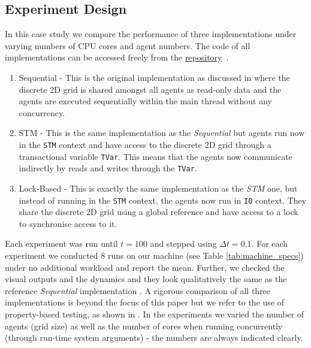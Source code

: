 \subsection{Experiment Design}
In this case study we compare the performance of three implementations under varying numbers of CPU cores and agent numbers. The code of all implementations can be accessed freely from the \href{https://github.com/thalerjonathan/haskell-stm-sir}{repository}~\cite{thaler_stm_sir_repository}.

\begin{enumerate}
	\item Sequential - This is the original implementation as discussed in \cite{thaler_pure_2018} where the discrete 2D grid is shared amongst all agents as read-only data and the agents are executed sequentially within the main thread without any concurrency.
	\item STM - This is the same implementation as the \textit{Sequential} but agents run now in the \texttt{STM} context and have access to the discrete 2D grid through a transactional variable \texttt{TVar}. This means that the agents now communicate indirectly by reads and writes through the \texttt{TVar}.
	\item Lock-Based - This is exactly the same implementation as the \textit{STM} one, but instead of running in the \texttt{STM} context, the agents now run in \texttt{IO} context. They share the discrete 2D grid using a global reference and have access to a lock to synchronise access to it.
\end{enumerate}

Each experiment was run until $t = 100$ and stepped using $\Delta t = 0.1$. For each experiment we conducted 8 runs on our machine (see Table \ref{tab:machine_specs}) under no additional workload and report the mean. Further, we checked the visual outputs and the dynamics and they look qualitatively the same as the reference \textit{Sequential} implementation \cite{thaler_pure_2018}. A rigorous comparison of all three implementations is beyond the focus of this paper but we refer to the use of property-based testing, as shown in \cite{thaler_show_2019}. In the experiments we varied the number of agents (grid size) as well as the number of cores when running concurrently (through run-time system arguments) - the numbers are always indicated clearly. %


